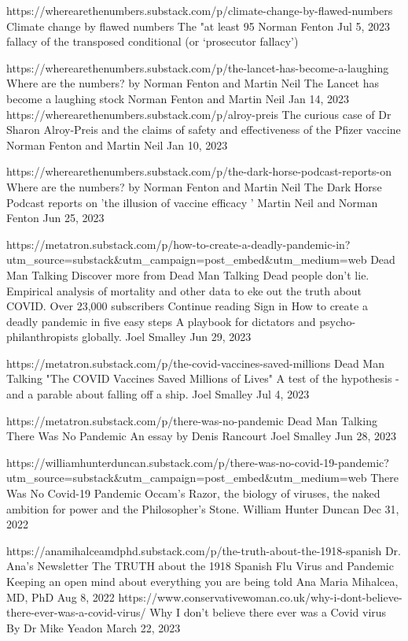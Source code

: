 https://wherearethenumbers.substack.com/p/climate-change-by-flawed-numbers
Climate change by flawed numbers
The "at least 95%
Norman Fenton
Jul 5, 2023
fallacy of the transposed conditional (or ‘prosecutor fallacy’) 



https://wherearethenumbers.substack.com/p/the-lancet-has-become-a-laughing
Where are the numbers? by Norman Fenton and Martin Neil
The Lancet has become a laughing stock
Norman Fenton
and Martin Neil
Jan 14, 2023
https://wherearethenumbers.substack.com/p/alroy-preis
The curious case of Dr Sharon Alroy-Preis and the claims of safety and effectiveness of the Pfizer vaccine
Norman Fenton
and Martin Neil
Jan 10, 2023



https://wherearethenumbers.substack.com/p/the-dark-horse-podcast-reports-on
Where are the numbers? by Norman Fenton and Martin Neil
The Dark Horse Podcast reports on 'the illusion of vaccine efficacy '
Martin Neil
and Norman Fenton
Jun 25, 2023



https://metatron.substack.com/p/how-to-create-a-deadly-pandemic-in?utm_source=substack&utm_campaign=post_embed&utm_medium=web
Dead Man Talking
Discover more from Dead Man Talking
Dead people don't lie. Empirical analysis of mortality and other data to eke out the truth about COVID.
Over 23,000 subscribers
Continue reading
Sign in
How to create a deadly pandemic in five easy steps
A playbook for dictators and psycho-philanthropists globally.
Joel Smalley
Jun 29, 2023


https://metatron.substack.com/p/the-covid-vaccines-saved-millions
Dead Man Talking
"The COVID Vaccines Saved Millions of Lives"
A test of the hypothesis - and a parable about falling off a ship.
Joel Smalley
Jul 4, 2023

https://metatron.substack.com/p/there-was-no-pandemic
Dead Man Talking
There Was No Pandemic
An essay by Denis Rancourt
Joel Smalley
Jun 28, 2023

https://williamhunterduncan.substack.com/p/there-was-no-covid-19-pandemic?utm_source=substack&utm_campaign=post_embed&utm_medium=web
There Was No Covid-19 Pandemic
Occam's Razor, the biology of viruses, the naked ambition for power and the Philosopher's Stone.
William Hunter Duncan
Dec 31, 2022

https://anamihalceamdphd.substack.com/p/the-truth-about-the-1918-spanish
Dr. Ana’s Newsletter
The TRUTH about the 1918 Spanish Flu Virus and Pandemic
Keeping an open mind about everything you are being told
Ana Maria Mihalcea, MD, PhD
Aug 8, 2022
https://www.conservativewoman.co.uk/why-i-dont-believe-there-ever-was-a-covid-virus/
Why I don’t believe there ever was a Covid virus
By
Dr Mike Yeadon
March 22, 2023

